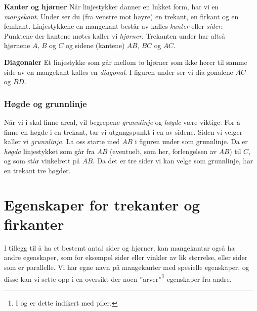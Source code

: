 \begin{comment}
\reg[Samsvarande vinklar]{
	Vinkler med eit høgre eller venstre vinkelbein felles, kallast \textit{samsvarende vinkler}. I figuren under er dei markerte vinklane samsvarande fordi alle tre har den raude linja som venstre vinkelbein.
\fig{vink4}
	Vinklar med parvis parallelle høgre og venstre vinkelbein er like store.
\fig{vink4b}
}
\end{comment}
\newpage
\textbf{Kanter og hjørner} \os
Når linjestykker danner en lukket form, har vi en \textit{mangekant}. Under ser du (fra venstre mot høyre) en trekant, en firkant og en femkant.
Linjestykkene en mangekant består av kalles \textit{kanter} eller \textit{sider}. Punktene der kantene møtes kaller vi \textit{hjørner}. Trekanten under har altså hjørnene $ A $, $ B $ og $ C $ og sidene (kantene) $ AB $, $ BC $ og $ AC $.
 \vsk

\textbf{Diagonaler} \os
Et linjestykke som går mellom to hjørner som ikke hører til samme side av en mangekant kalles en \textit{diagonal}. I figuren under ser vi dia-gonalene $ AC $ og $ BD $.
\newpage
\subsubsection{Høgde og grunnlinje}
Når vi i  skal finne areal, vil begrepene \textit{grunnlinje} og \textit{høgde} være viktige. For å finne en høgde i en trekant, tar vi utgangspunkt i en av sidene. Siden vi velger kaller vi \textit{grunnlinja}. La oss starte med $ AB $ i figuren under som grunnlinje. Da er \textit{høgda} linjestykket som går fra $ AB $ (eventuelt, som her, forlengelsen av $ AB $) til $ C $, og som står vinkelrett på $ AB $.
Da det er tre sider vi kan velge som grunnlinje, har en trekant tre høgder.
\section{Egenskaper for trekanter og firkanter}
I tillegg til å ha et bestemt antal sider og hjørner, kan mangekantar også ha andre egenskaper, som for eksempel sider eller vinkler av lik størrelse, eller sider som er parallelle. Vi har egne navn på mangekanter med spesielle egenskaper, og disse kan vi sette opp i en oversikt der noen ''arver''\footnote{I  og  er dette indikert med piler.} egenskaper fra andre.\regv


